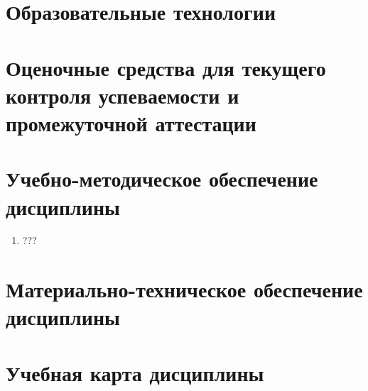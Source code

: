 



\section{Образовательные технологии}

\section{Оценочные средства для текущего контроля успеваемости и промежуточной аттестации}

\section{Учебно-методическое обеспечение дисциплины}


\begin{enumerate}%
	\item ???
\end{enumerate}




\section{Материально-техническое обеспечение дисциплины}
	



\section{Учебная карта дисциплины}






